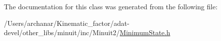 The documentation for this class was generated from the following file\+:\begin{DoxyCompactItemize}
\item 
/\+Users/archanar/\+Kinematic\+\_\+factor/adat-\/devel/other\+\_\+libs/minuit/inc/\+Minuit2/\mbox{\hyperlink{adat-devel_2other__libs_2minuit_2inc_2Minuit2_2MinimumState_8h}{Minimum\+State.\+h}}\end{DoxyCompactItemize}
